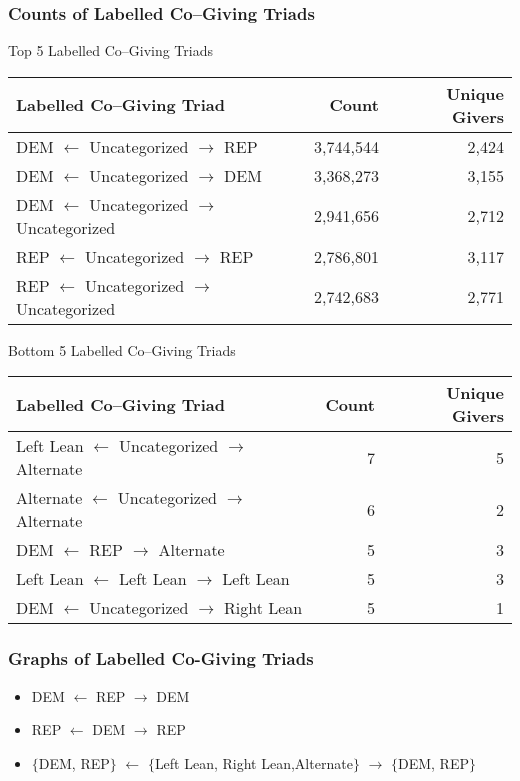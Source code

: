 \documentclass{beamer}
\begin{document}
\begin{frame}
\frametitle{Counts of Labelled Co--Giving Triads}
\vspace{-0.3cm}
\small

\begin{table}[!htb]
\centering
Top 5 Labelled Co--Giving Triads
\begin{tabular}{lrr}
\toprule
               {\bf{Labelled Co--Giving Triad}} &       {\bf{Count}} & {\bf{Unique Givers}} \\
\midrule

DEM $\leftarrow$ Uncategorized $\rightarrow$ REP & 3,744,544 & 2,424\\
DEM $\leftarrow$ Uncategorized $\rightarrow$ DEM & 3,368,273 & 3,155\\
DEM  $\leftarrow$  Uncategorized $\rightarrow$ Uncategorized & 2,941,656 & 2,712\\
REP  $\leftarrow$  Uncategorized $\rightarrow$ REP & 2,786,801 & 3,117\\
REP  $\leftarrow$  Uncategorized $\rightarrow$ Uncategorized & 2,742,683 & 2,771\\
\bottomrule
\end{tabular}
\end{table}

\begin{table}[!htb]
\centering
Bottom 5 Labelled Co--Giving Triads
\begin{tabular}{lrr}
\toprule
               {\bf{Labelled Co--Giving Triad}} &       {\bf{Count}} & {\bf{Unique Givers}} \\
\midrule

Left Lean  $\leftarrow$  Uncategorized $\rightarrow$ Alternate & 7 & 5\\
Alternate  $\leftarrow$  Uncategorized $\rightarrow$ Alternate & 6 & 2\\
DEM $\leftarrow$ REP $\rightarrow$ Alternate & 5 & 3\\
Left Lean  $\leftarrow$  Left Lean $\rightarrow$ Left Lean & 5 & 3\\
DEM  $\leftarrow$  Uncategorized $\rightarrow$ Right Lean & 5 & 1\\
\bottomrule
\end{tabular}
\end{table}

\end{frame}





\begin{frame}
\frametitle{Graphs of Labelled Co-Giving Triads}

\begin{center}
\Large
\begin{itemize}
\item DEM $\leftarrow$ REP $\rightarrow$ DEM %
\item REP $\leftarrow$ DEM $\rightarrow$ REP%
\item $\{$DEM, REP$\}$ $\leftarrow$ $\{$Left Lean, Right Lean,Alternate$\}$ $\rightarrow$ $\{$DEM, REP$\}$%
\end{itemize}
\end{center}

\end{frame}
\end{document}
